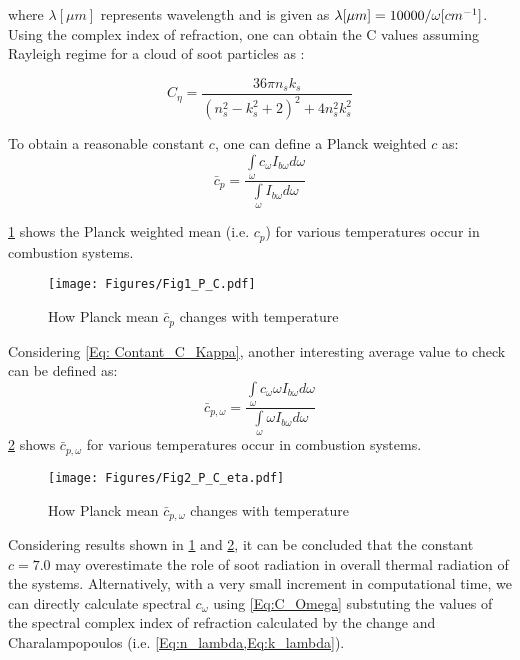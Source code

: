 \documentclass[3p]{elsarticle}
\begin{document}
where \({\lambda [\mu m]}\) represents wavelength and is given as \(\lambda [\mu m] = {{10000} \mathord{\left/
		{\vphantom {{10000} \omega }} \right.
		\kern-\nulldelimiterspace} \omega }[c{m^{ - 1}}]\).
Using the complex index of refraction, one can obtain the C values assuming Rayleigh regime for a cloud of soot particles as \cite{modest2013radiative,ChangeCharalampopoulos1990}:

\begin{equation}
C_\eta=\frac{36\pi n_s k_s}{(n_s^2-k_s^2+2)^2+4 n_s^2 k_s^2}
\label{Eq:C_Omega}
\end{equation}

To obtain a reasonable constant  \(c\), one can define a Planck weighted \(c\) as:
\begin{equation}
{\bar c_p} = \frac{{\int\limits_\omega  {{c_\omega }{I_{b\omega }}d\omega } }}{{\int\limits_\omega  {{I_{b\omega }}d\omega } }}
\end{equation}

\cref{Fig: PlanckWeightedC} shows the Planck weighted mean (i.e. \(c_p\)) for various temperatures occur in combustion systems.

\begin{figure}[h!]
			\centering\texttt{[image: Figures/Fig1\_P\_C.pdf]}
			\caption{How  Planck  mean  \({\bar c_p}\)  changes  with  temperature}
			\label{Fig: PlanckWeightedC}
\end{figure}
Considering \cref{Eq: Contant_C_Kappa}, another interesting average value to check can be defined as:
\begin{equation}
{\bar c_{p,\omega }} = \frac{{\int\limits_\omega  {{c_\omega }\omega {I_{b\omega }}d\omega } }}{{\int\limits_\omega  {\omega {I_{b\omega }}d\omega } }}
\end{equation}
\cref{Fig: PlanckWeightedCEta} shows \(\bar c_{p,\omega }\) for various temperatures occur in combustion systems.
  
\begin{figure}
	\centering\texttt{[image: Figures/Fig2\_P\_C\_eta.pdf]}
	\caption{How  Planck  mean  \({\bar c_{p,\omega }}\)  changes  with  temperature}
	\label{Fig: PlanckWeightedCEta}
\end{figure}
Considering results shown in  \cref{Fig: PlanckWeightedC} and \cref{Fig: PlanckWeightedCEta}, it can be concluded that the constant \(c = 7.0\) may overestimate the role of soot radiation in overall thermal radiation of the systems. Alternatively, with a very small increment in computational time, we can directly calculate spectral  \(c_\omega\) using \cref{Eq:C_Omega} substuting the values of the spectral complex index of refraction calculated by the change and  Charalampopoulos \cite{ChangeCharalampopoulos1990} (i.e. \cref{Eq:n_lambda,Eq:k_lambda}).
\end{document}

